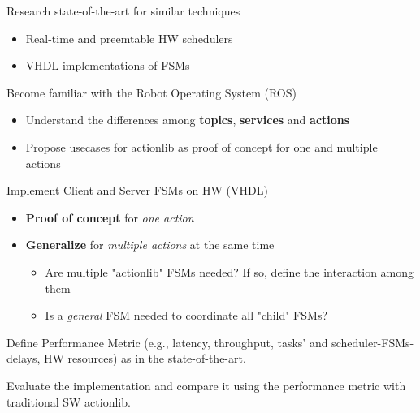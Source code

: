 \documentclass[ngerman]{tudscrreprt}	%
\begin{document}
{	%
	}{%
	\vspace{-0.1cm}\item Research state-of-the-art for similar techniques
        \begin{itemize}
            \vspace{-0.1cm}\item Real-time and preemtable HW schedulers
            \vspace{-0.1cm}\item VHDL implementations of FSMs 
        \end{itemize}
		\vspace{-0.1cm}\item Become familiar with the Robot Operating System (ROS)
        \begin{itemize}
            \vspace{-0.1cm}\item Understand the differences among \textbf{topics}, \textbf{services} and \textbf{actions}
            \vspace{-0.1cm}\item Propose usecases for actionlib as proof of concept for one and multiple actions
        \end{itemize}
		\vspace{-0.1cm}\item Implement Client and Server FSMs on HW (VHDL)
        \begin{itemize}
            \vspace{-0.1cm}\item \textbf{Proof of concept} for \textit{one action}
            \vspace{-0.1cm}\item \textbf{Generalize} for \textit{multiple actions} at the same time
            \begin{itemize}
                \vspace{-0.1cm}\item Are multiple "actionlib" FSMs needed? If so, define the interaction among them
                \vspace{-0.1cm}\item Is a \textit{general} FSM needed to coordinate all "child" FSMs?
            \end{itemize}
        \end{itemize}
		\vspace{-0.1cm}\item Define Performance Metric (e.g., latency, throughput, tasks' and scheduler-FSMs- delays, HW resources) as in the state-of-the-art.
		\vspace{-0.1cm}\item Evaluate the implementation and compare it using the performance metric with traditional SW actionlib.
	}
	
\end{document}
